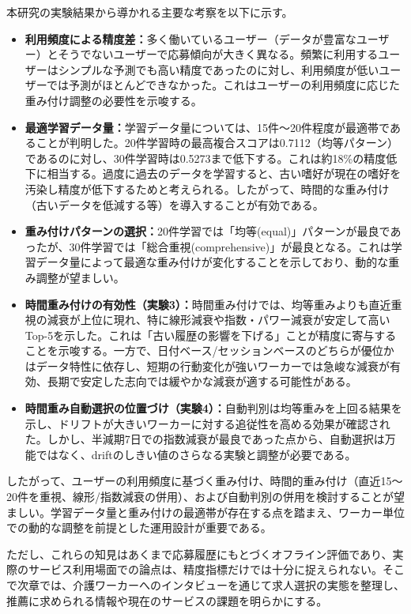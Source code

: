 本研究の実験結果から導かれる主要な考察を以下に示す。

\begin{itemize}
\item \textbf{利用頻度による精度差：}多く働いているユーザー（データが豊富なユーザー）とそうでないユーザーで応募傾向が大きく異なる。頻繁に利用するユーザーはシンプルな予測でも高い精度であったのに対し、利用頻度が低いユーザーでは予測がほとんどできなかった。これはユーザーの利用頻度に応じた重み付け調整の必要性を示唆する。

\item \textbf{最適学習データ量：}学習データ量については、15件〜20件程度が最適帯であることが判明した。20件学習時の最高複合スコアは0.7112（均等パターン）であるのに対し、30件学習時は0.5273まで低下する。これは約18\%の精度低下に相当する。過度に過去のデータを学習すると、古い嗜好が現在の嗜好を汚染し精度が低下するためと考えられる。したがって、時間的な重み付け（古いデータを低減する等）を導入することが有効である。

\item \textbf{重み付けパターンの選択：}20件学習では「均等(equal)」パターンが最良であったが、30件学習では「総合重視(comprehensive)」が最良となる。これは学習データ量によって最適な重み付けが変化することを示しており、動的な重み調整が望ましい。

\item \textbf{時間重み付けの有効性（実験3）：}時間重み付けでは、均等重みよりも直近重視の減衰が上位に現れ、特に線形減衰や指数・パワー減衰が安定して高いTop-5を示した。これは「古い履歴の影響を下げる」ことが精度に寄与することを示唆する。一方で、日付ベース/セッションベースのどちらが優位かはデータ特性に依存し、短期の行動変化が強いワーカーでは急峻な減衰が有効、長期で安定した志向では緩やかな減衰が適する可能性がある。

\item \textbf{時間重み自動選択の位置づけ（実験4）：}自動判別は均等重みを上回る結果を示し、ドリフトが大きいワーカーに対する追従性を高める効果が確認された。しかし、半減期7日での指数減衰が最良であった点から、自動選択は万能ではなく、driftのしきい値のさらなる実験と調整が必要である。
\end{itemize}

したがって、ユーザーの利用頻度に基づく重み付け、時間的重み付け（直近15〜20件を重視、線形/指数減衰の併用）、および自動判別の併用を検討することが望ましい。学習データ量と重み付けの最適帯が存在する点を踏まえ、ワーカー単位での動的な調整を前提とした運用設計が重要である。

ただし、これらの知見はあくまで応募履歴にもとづくオフライン評価であり、実際のサービス利用場面での論点は、精度指標だけでは十分に捉えられない。そこで次章では、介護ワーカーへのインタビューを通じて求人選択の実態を整理し、推薦に求められる情報や現在のサービスの課題を明らかにする。
